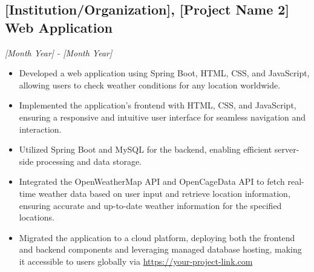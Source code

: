 \documentclass[a4paper,10pt]{article}
\begin{document}
\subsection*{[Institution/Organization], [Project Name 2] Web Application}
\textit{[Month Year] - [Month Year]}
\begin{itemize}[noitemsep]
\item Developed a web application using Spring Boot, HTML, CSS, and JavaScript, allowing users to check weather conditions for any location worldwide.
\item Implemented the application's frontend with HTML, CSS, and JavaScript, ensuring a responsive and intuitive user interface for seamless navigation and interaction.
\item Utilized Spring Boot and MySQL for the backend, enabling efficient server-side processing and data storage.
\item Integrated the OpenWeatherMap API and OpenCageData API to fetch real-time weather data based on user input and retrieve location information, ensuring accurate and up-to-date weather information for the specified locations.
\item Migrated the application to a cloud platform, deploying both the frontend and backend components and leveraging managed database hosting, making it accessible to users globally via \href{https://your-project-link.com}{https://your-project-link.com}
\end{itemize}
\end{document}
